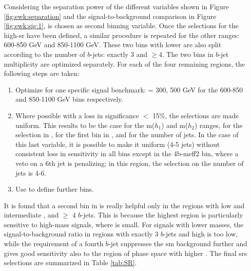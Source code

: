Considering the separation power of the different variables shown in Figure  \ref{fig:ewk:separation} 
and the signal-to-background comparison in Figure \ref{fig:ewk:sig:1}, 
\dRmax is chosen as second binning variable. 
Once the selections for the high-\meffb \gls{sr} have been defined, 
a similar procedure is repeated for the other \meffb ranges: 600-850 GeV and 850-1100 GeV. 
These two bins with lower \meffb are also split according to the number of $b$-jets: exactly 3 and $\geq$4. 
The two bins in $b$-jet multiplicity are optimized separately. 
For each of the four remaining regions, the following steps are taken:

\begin{enumerate}
\item Optimize for one specific signal benchmark: \mhino = 300, 500 GeV for the 600-850 and 850-1100 GeV \meffb bins respectively.
\item  Where possible with a loss in significance $<$ 15\%, the selections are made uniform. 
This results to be the case for the m($h_1$) and m($h_2$) ranges, for the selection in \met, for the first bin in \dRmax, 
and for the number of jets. In the case of this last variable, it is possible to make it uniform (4-5 jets) 
without consistent loss in sensitivity in all bins except in the 4b-meff2 bin, where a veto on a 6th jet is penalizing; 
in this region, the selection on the number of jets is 4-6.
\item Use \dRmax to define further bins.
\end{enumerate}

It is found that a second bin in \dRmax is really helpful only in the regions with low and intermediate \meffb, and  $\geq$ 4 $b$-jets. 
This is because the highest \meffb region is particularly sensitive to high-mass signals, where \dRmax is small. 
For signals with lower masses, the signal-to-background ratio in regions with exactly 3 $b$-jets and high \dRmax is too low, 
while the requirement of a fourth $b$-jet suppresses the \gls{sm} background further and gives good sensitivity 
also to the region of phase space with higher \dRmax.
The final \glspl{sr} selections are summarized in Table \ref{tab:SR}.

